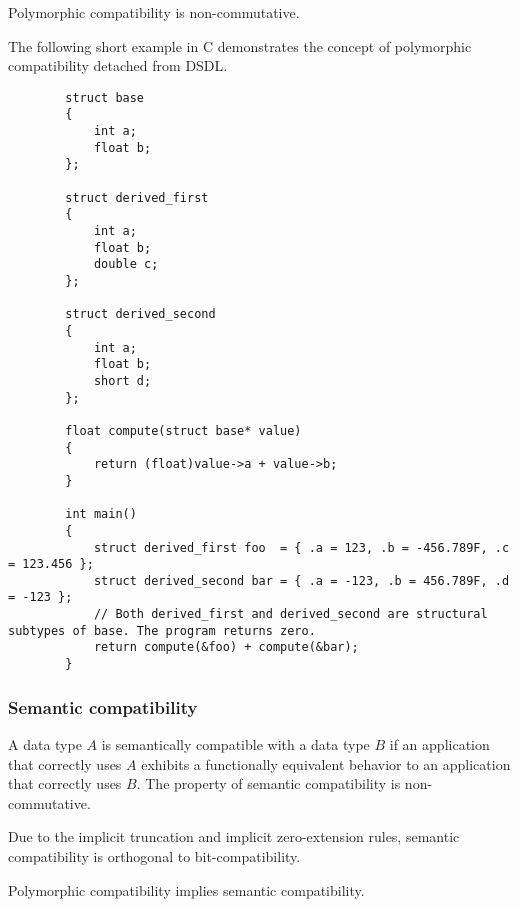 Polymorphic compatibility is non-commutative.

\begin{remark}[breakable]
    The following short example in C demonstrates the concept of polymorphic compatibility detached from DSDL.

    \begin{verbatim}
        struct base
        {
            int a;
            float b;
        };

        struct derived_first
        {
            int a;
            float b;
            double c;
        };

        struct derived_second
        {
            int a;
            float b;
            short d;
        };

        float compute(struct base* value)
        {
            return (float)value->a + value->b;
        }

        int main()
        {
            struct derived_first foo  = { .a = 123, .b = -456.789F, .c = 123.456 };
            struct derived_second bar = { .a = -123, .b = 456.789F, .d = -123 };
            // Both derived_first and derived_second are structural subtypes of base. The program returns zero.
            return compute(&foo) + compute(&bar);
        }
    \end{verbatim}
\end{remark}

\subsubsection{Semantic compatibility}\label{sec:dsdl_semantic_compatibility}

A data type $A$ is semantically compatible with a data type $B$
if an application that correctly uses $A$ exhibits a functionally equivalent behavior to an application
that correctly uses $B$.
The property of semantic compatibility is non-commutative.

Due to the implicit truncation and implicit zero-extension rules,
semantic compatibility is orthogonal to bit-compatibility.

Polymorphic compatibility implies semantic compatibility.

